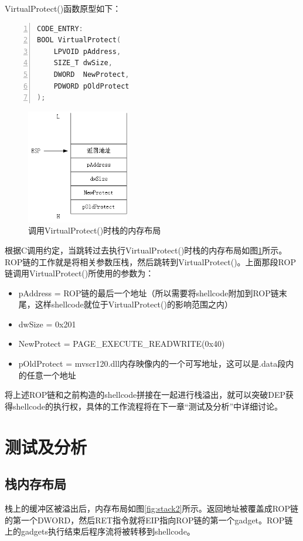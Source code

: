 \documentclass[bachelor]{thesis-uestc}
\begin{document}
VirtualProtect()函数原型如下：

\begin{lstlisting}[language=C++, basicstyle=\ttfamily\tiny, numbers=left, numberstyle=\tiny, keywordstyle=\color{blue!70}, commentstyle=\color{red!50!green!50!blue!50}, frame=shadowbox, rulesepcolor=\color{red!20!green!20!blue!20}]
CODE_ENTRY:
BOOL VirtualProtect(
	LPVOID pAddress,
	SIZE_T dwSize,
	DWORD  NewProtect,
	PDWORD pOldProtect
);
\end{lstlisting}

\begin{figure}[htbp]
	\centering\includegraphics[height=5cm]{images/stack1.png}
	\caption{调用VirtualProtect()时栈的内存布局}
	\label{fig:stack1}
\end{figure}

根据C调用约定，当跳转过去执行VirtualProtect()时栈的内存布局如图\ref{fig:stack1}所示。ROP链的工作就是将相关参数压栈，然后跳转到VirtualProtect()。上面那段ROP链调用VirtualProtect()所使用的参数为：

\begin{itemize}
	\item pAddress = ROP链的最后一个地址（所以需要将shellcode附加到ROP链末尾，这样shellcode就位于VirtualProtect()的影响范围之内）
	\item dwSize = 0x201
	\item NewProtect = PAGE\_EXECUTE\_READWRITE(0x40)
	\item pOldProtect = mvscr120.dll内存映像内的一个可写地址，这可以是.data段内的任意一个地址
\end{itemize}

将上述ROP链和之前构造的shellcode拼接在一起进行栈溢出，就可以突破DEP获得shellcode的执行权，具体的工作流程将在下一章``测试及分析''中详细讨论。

\chapter{测试及分析}
\section{栈内存布局}
栈上的缓冲区被溢出后，内存布局如图\ref{fig:stack2}所示。返回地址被覆盖成ROP链的第一个DWORD，然后RET指令就将EIP指向ROP链的第一个gadget。ROP链上的gadgets执行结束后程序流将被转移到shellcode。
\end{document}

